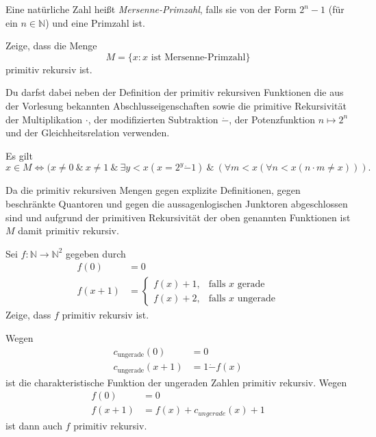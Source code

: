 \documentclass[german,headsepline]{scrartcl}
\theoremstyle{definition}
\begin{document}
	\begin{question}[subtitle={Nachklausur 2013}]
		Eine natürliche Zahl heißt \emph{Mersenne-Primzahl}, falls sie von der Form $2^n-1$ (für ein $n\in\mathbb{N}$) und eine Primzahl ist.
		
		Zeige, dass die Menge
		\[M=\{x\colon x\text{ ist Mersenne-Primzahl}\}\]
		primitiv rekursiv ist.
		
		Du darfst dabei neben der Definition der primitiv rekursiven Funktionen
		die aus der Vorlesung bekannten Abschlusseigenschaften
		sowie die primitive Rekursivität der Multiplikation $\cdot$,
		der modifizierten Subtraktion $\dot{-}$,
		der Potenzfunktion $n\mapsto2^n$ und der Gleichheitsrelation verwenden.
	\end{question}
	\begin{solution}
		Es gilt
		\[x\in M\Leftrightarrow(x\neq0~\&~x\neq1~\&~\exists y<x(x=2^y\dot{-}1)~\&~(\forall m<x(\forall n<x(n\cdot m\neq x))).\]
		
		Da die primitiv rekursiven Mengen gegen explizite Definitionen,
		gegen beschränkte Quantoren und gegen die aussagenlogischen Junktoren abgeschlossen sind
		und aufgrund der primitiven Rekursivität der oben genannten Funktionen
		ist $M$ damit primitiv rekursiv.
	\end{solution}
	
	\begin{question}[subtitle={Blatt 13, 2015}]
		Sei $f:\mathbb{N}\to\mathbb{N}^2$ gegeben durch
		\begin{align*}
			f(0) &= 0 \\
			f(x+1) &= \begin{cases}
				f(x)+1, &\text{falls $x$ gerade} \\
				f(x)+2, &\text{falls $x$ ungerade}
			\end{cases}
		\end{align*}
		Zeige, dass $f$ primitiv rekursiv ist.
	\end{question}
	\begin{solution}
		Wegen
		\begin{align*}
			c_{\text{ungerade}}(0) &= 0 \\
			c_{\text{ungerade}}(x+1) &= 1\dot{-}f(x)
		\end{align*}
		ist die charakteristische Funktion der ungeraden Zahlen primitiv rekursiv.
		Wegen
		\begin{align*}
			f(0) &= 0 \\
			f(x+1) &= f(x) + c_{ungerade}(x) + 1
		\end{align*}
		ist dann auch $f$ primitiv rekursiv.
	\end{solution}
	
\end{document}
